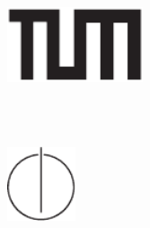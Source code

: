 \begin{titlepage}
  \centering

  \includegraphics[width=40mm]{logos/tum}

  \vspace{5mm}
  {\huge\MakeUppercase{\getFaculty{}}}\\

  \vspace{5mm}
  {\large\MakeUppercase{\getUniversity{}}}\\
 
  \vspace{20mm}
  {\Large \getDoctype{}}

  \vspace{15mm}
  {\huge\bfseries \getTitle{}}


  \vspace{15mm}

  \vspace{20mm}
  \includegraphics[width=20mm]{logos/faculty}
\end{titlepage}
